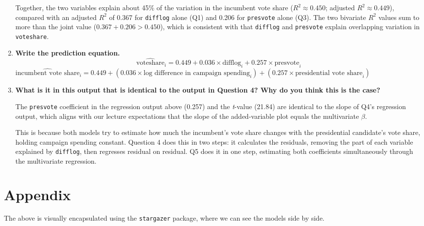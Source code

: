 \documentclass[12pt,letterpaper]{article}
\begin{document}
\begin{enumerate}
			\noindent Together, the two variables explain about 45\% of the variation in the incumbent vote share ($R^2 \approx 0.450$; adjusted $R^2 \approx 0.449$), compared with an adjusted $R^2$ of 0.367 for \texttt{difflog} alone (Q1) and 0.206 for \texttt{presvote} alone (Q3). The two bivariate $R^2$ values sum to more than the joint value ($0.367 + 0.206 > 0.450$), which is consistent with that \texttt{difflog} and \texttt{presvote} explain overlapping variation in \texttt{voteshare}.
		\vspace{.5cm}
		
		\item \textbf{Write the prediction equation.}
			{\LARGE $$ \widehat{\text{voteshare}}_i = 0.449 + 0.036 \times \text{difflog}_i + 0.257 \times \text{presvote}_i $$}
			\noindent $\widehat{\text{incumbent vote share}}_i = 0.449 + (0.036 \times \text{log difference in campaign spending}_i) + (0.257 \times \text{presidential vote share}_i) $
			
		\vspace{1cm}
		\item \textbf{What is it in this output that is identical to the output in Question 4? Why do you think this is the case?} \vspace{.5cm}
		
		\noindent The \texttt{presvote} coefficient in the regression output above (0.257) and the \textit{t}-value (21.84) are identical to the slope of Q4's regression output, which aligns with our lecture expectations that the slope of the added-variable plot equals the multivariate $\beta$.
		
		\noindent This is because both models try to estimate how much the incumbent’s vote share changes with the presidential candidate's vote share, holding campaign spending constant. Question 4 does this in two steps: it calculates the residuals, removing the part of each variable explained by \texttt{difflog}, then regresses residual on residual. Q5 does it in
		one step, estimating both coefficients simultaneously through the multivariate regression.
		
	\end{enumerate}
	
\newpage
\section*{Appendix}
\noindent The above is visually encapsulated using the \texttt{stargazer} package, where we can see the models side by side.
\vspace{.5cm}
	
\end{document}
